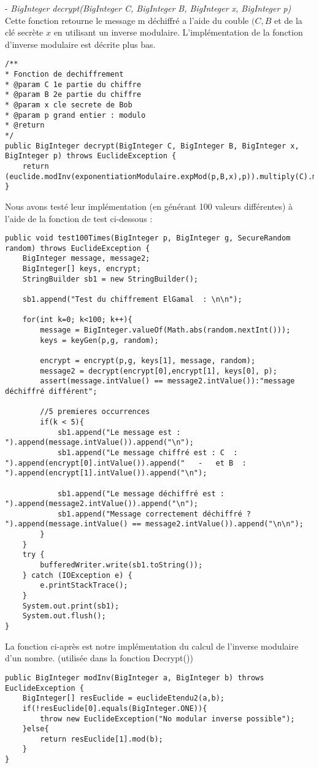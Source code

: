 \documentclass[a4paper,11pt]{article}
\begin{document}
        - \textit{BigInteger decrypt(BigInteger C, BigInteger B, BigInteger x, BigInteger p)} Cette fonction retourne le message m déchiffré a l'aide du couble $(C,B$ et de la clé secrète $x$ en utilisant un inverse modulaire. L'implémentation de la fonction d'inverse modulaire est décrite plus bas.
        \begin{lstlisting}[caption=decrypt, captionpos=b,breaklines = true]
/**
* Fonction de dechiffrement
* @param C 1e partie du chiffre
* @param B 2e partie du chiffre
* @param x cle secrete de Bob
* @param p grand entier : modulo
* @return
*/
public BigInteger decrypt(BigInteger C, BigInteger B, BigInteger x, BigInteger p) throws EuclideException {
    return (euclide.modInv(exponentiationModulaire.expMod(p,B,x),p)).multiply(C).mod(p);
}
        \end{lstlisting}Nous avons testé leur implémentation (en générant 100 valeurs différentes) à l'aide de la fonction de test ci-dessous : \\\begin{lstlisting}[caption=Test chiffrement El-Gamal, captionpos=b,breaklines = true]
public void test100Times(BigInteger p, BigInteger g, SecureRandom random) throws EuclideException {
    BigInteger message, message2;
    BigInteger[] keys, encrypt;
    StringBuilder sb1 = new StringBuilder();

    sb1.append("Test du chiffrement ElGamal  : \n\n");

    for(int k=0; k<100; k++){
        message = BigInteger.valueOf(Math.abs(random.nextInt()));
        keys = keyGen(p,g, random);

        encrypt = encrypt(p,g, keys[1], message, random);
        message2 = decrypt(encrypt[0],encrypt[1], keys[0], p);
        assert(message.intValue() == message2.intValue()):"message déchiffré différent";

        //5 premieres occurrences
        if(k < 5){
            sb1.append("Le message est : ").append(message.intValue()).append("\n");
            sb1.append("Le message chiffré est : C  : ").append(encrypt[0].intValue()).append("   -   et B  : ").append(encrypt[1].intValue()).append("\n");

            sb1.append("Le message déchiffré est : ").append(message2.intValue()).append("\n");
            sb1.append("Message correctement déchiffré ?  ").append(message.intValue() == message2.intValue()).append("\n\n");
        }
    }
    try {
        bufferedWriter.write(sb1.toString());
    } catch (IOException e) {
        e.printStackTrace();
    }
    System.out.print(sb1);
    System.out.flush();
}
        \end{lstlisting}La fonction ci-après est notre implémentation du calcul de l'inverse modulaire d'un nombre. (utilisée dans la fonction Decrypt()) \\\begin{lstlisting}[caption=Inverse modulaire, captionpos=b,breaklines = true]
public BigInteger modInv(BigInteger a, BigInteger b) throws EuclideException {
    BigInteger[] resEuclide = euclideEtendu2(a,b);
    if(!resEuclide[0].equals(BigInteger.ONE)){
        throw new EuclideException("No modular inverse possible");
    }else{
        return resEuclide[1].mod(b);
    }
}
        \end{lstlisting}
\end{document}

